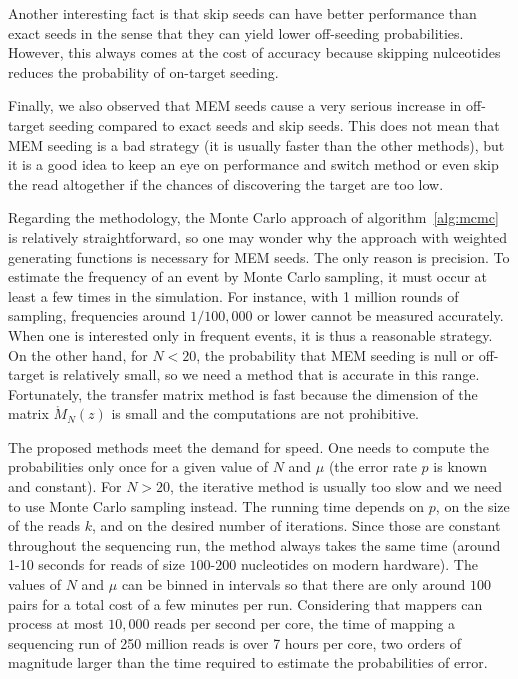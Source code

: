 \documentclass{article}
\begin{document}
Another interesting fact is that skip seeds can have better performance
than exact seeds in the sense that they can yield lower off-seeding
probabilities. However, this always comes at the cost of accuracy because
skipping nulceotides reduces the probability of on-target seeding.

Finally, we also observed that MEM seeds cause a very serious increase in
off-target seeding compared to exact seeds and skip seeds. This does not
mean that MEM seeding is a bad strategy (it is usually faster than the
other methods), but it is a good idea to keep an eye on performance and
switch method or even skip the read altogether if the chances of
discovering the target are too low.

Regarding the methodology, the Monte Carlo approach of
algorithm~\ref{alg:mcmc} is relatively straightforward, so one may wonder
why the approach with weighted generating functions is necessary for MEM
seeds. The only reason is precision. To estimate the frequency of an event
by Monte Carlo sampling, it must occur at least a few times in the
simulation. For instance, with 1 million rounds of sampling, frequencies
around $1/100,000$ or lower cannot be measured accurately. When one is
interested only in frequent events, it is thus a reasonable strategy. On
the other hand, for $N < 20$, the probability that MEM seeding is null or
off-target is relatively small, so we need a method that is accurate in
this range. Fortunately, the transfer matrix method is fast because the
dimension of the matrix $\mathring{M}_N(z)$ is small and the computations
are not prohibitive.

The proposed methods meet the demand for speed. One needs to compute the
probabilities only once for a given value of $N$ and $\mu$ (the error rate
$p$ is known and constant). For $N > 20$, the iterative method is usually
too slow and we need to use Monte Carlo sampling instead. The running
time depends on $p$, on the size of the reads $k$, and on the desired
number of iterations. Since those are constant throughout the sequencing
run, the method always takes the same time (around 1-10 seconds for reads
of size $100$-$200$ nucleotides on modern hardware). The values of $N$ and
$\mu$ can be binned in intervals so that there are only around $100$ pairs
for a total cost of a few minutes per run. Considering that mappers can
process at most $10,000$ reads per second per core, the time of mapping a
sequencing run of 250 million reads is over 7 hours per core, two orders
of magnitude larger than the time required to estimate the probabilities
of error.
\end{document}
